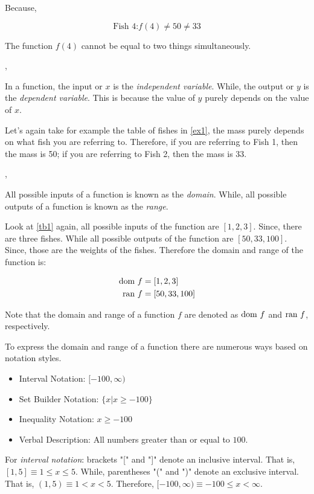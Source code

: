 Because,

\[
    \text{Fish 4:}f(4)\neq50\neq33
\]

The function \(f(4)\) cannot be equal to two things simultaneously.

\sep

In a function, the input or \(x\) is the \emph{independent variable}. While, the output or \(y\) is the \emph{dependent variable}. This is because the value of \(y\) purely depends on the value of \(x\).

Let's again take for example the table of fishes in \cref{ex1}, the mass purely depends on what fish you are referring to. Therefore, if you are referring to Fish 1, then the mass is 50; if you are referring to Fish 2, then the mass is 33.

\sep

All possible inputs of a function is known as the \emph{domain}. While, all possible outputs of a function is known as the \emph{range}.

Look at \cref{tb1} again, all possible inputs of the function are \([1,2,3]\). Since, there are three fishes. While all possible outputs of the function are \([50,33,100]\). Since, those are the weights of the fishes. Therefore the domain and range of the function is:

\begin{align*}
    \text{dom } f &= [1,2,3]\\
    \text{ran } f &= [50,33,100]
\end{align*}

Note that the domain and range of a function \(f\) are denoted as \(\text{dom } f\) and \(\text{ran } f\), respectively.

To express the domain and range of a function there are numerous ways based on notation styles.
\begin{itemize}
    \item Interval Notation: \([-100, \infty)\)
    \item Set Builder Notation: \(\{x | x \geq -100\}\)
    \item Inequality Notation: \(x \geq -100\)
    \item Verbal Description: All numbers greater than or equal to \(100\).
\end{itemize}

For \emph{interval notation}: brackets "[" and "]" denote an inclusive interval. That is, \([1,5] \equiv 1 \leq x \leq 5\). While, parentheses "(" and ")" denote an exclusive interval. That is, \((1,5) \equiv 1 < x < 5\). Therefore, \([-100, \infty) \equiv -100 \leq x < \infty\).

